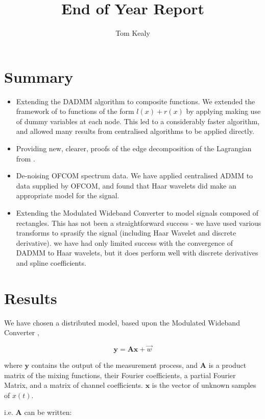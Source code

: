 \documentclass{article}
\title{End of Year Report}
\author{Tom Kealy}
\begin{document}
\maketitle
\section{Summary}
\begin{itemize}
\item Extending the DADMM algorithm to composite functions. We extended the framework of \cite{mota2013d} to functions of the form \(l\left(x\right) + r\left(x\right)\) by applying making use of dummy variables at each node. This led to a considerably faster algorithm, and allowed many results from centralised algorithms to be applied directly.
\item Providing new, clearer, proofs of the edge decomposition of the Lagrangian from \cite{mota2013d}. 
\item De-noising OFCOM spectrum data. We have applied centralised ADMM to data supplied by OFCOM, and found that Haar wavelets did make an appropriate model for the signal.
\item Extending the Modulated Wideband Converter to model signals composed of rectangles. This has not been a straightforward success - we have used various transforms to sprasify the signal (including Haar Wavelet and discrete derivative). we have had only limited success with the convergence of DADMM to Haar wavelets, but it does perform well with discrete derivatives and spline coefficients. 
\end{itemize}

\section{Results} \label{sec:results}
We have chosen a distributed model, based upon the Modulated Wideband Converter \cite{mishali2010theory} \cite{Zhang2011b}, 

\begin{equation}
\textbf{y} = \textbf{A}\textbf{x} + \vec{w}
\label{system}
\end{equation}

where \(\textbf{y}\) contains the output of the measurement process, and \(\textbf{A}\) is a product matrix of the mixing functions, their Fourier coefficients, a partial Fourier Matrix, and a matrix of channel coefficients. \(\textbf{x}\) is the vector of unknown samples of \(x\left(t\right)\). 

i.e. \(\textbf{A}\) can be written: 
\end{document}
